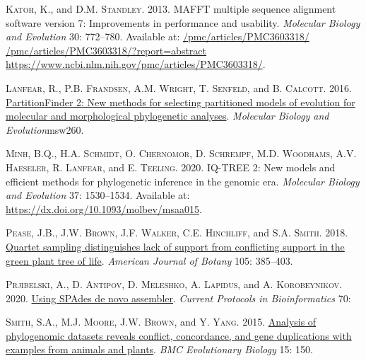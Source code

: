\documentclass[
  12pt,
]{article}
\newlength{\cslhangindent}
\newlength{\cslentryspacingunit} %
\newenvironment{CSLReferences}[2] %
 {%
  \setlength{\parindent}{0pt}
  \ifodd #1
  \let\oldpar\par
  \def\par{\hangindent=\cslhangindent\oldpar}
  \fi
  \setlength{\parskip}{#2\cslentryspacingunit}
 }%
 {}
\begin{document}
\begin{CSLReferences}{1}{0}
\leavevmode{}%
\textsc{Katoh, K.}, and \textsc{D.M. Standley}. 2013. MAFFT multiple sequence alignment software version 7: Improvements in performance and usability. \emph{Molecular Biology and Evolution} 30: 772--780. Available at: \href{/pmc/articles/PMC3603318/\%20/pmc/articles/PMC3603318/?report=abstract\%20https://www.ncbi.nlm.nih.gov/pmc/articles/PMC3603318/}{/pmc/articles/PMC3603318/ /pmc/articles/PMC3603318/?report=abstract https://www.ncbi.nlm.nih.gov/pmc/articles/PMC3603318/}.

\leavevmode{}%
\textsc{Lanfear, R.}, \textsc{P.B. Frandsen}, \textsc{A.M. Wright}, \textsc{T. Senfeld}, and \textsc{B. Calcott}. 2016. \href{https://doi.org/10.1093/molbev/msw260}{PartitionFinder 2: New methods for selecting partitioned models of evolution for molecular and morphological phylogenetic analyses}. \emph{Molecular Biology and Evolution}msw260.

\leavevmode{}%
\textsc{Minh, B.Q.}, \textsc{H.A. Schmidt}, \textsc{O. Chernomor}, \textsc{D. Schrempf}, \textsc{M.D. Woodhams}, \textsc{A.V. Haeseler}, \textsc{R. Lanfear}, and \textsc{E. Teeling}. 2020. IQ-TREE 2: New models and efficient methods for phylogenetic inference in the genomic era. \emph{Molecular Biology and Evolution} 37: 1530--1534. Available at: \url{https://dx.doi.org/10.1093/molbev/msaa015}.

\leavevmode{}%
\textsc{Pease, J.B.}, \textsc{J.W. Brown}, \textsc{J.F. Walker}, \textsc{C.E. Hinchliff}, and \textsc{S.A. Smith}. 2018. \href{https://doi.org/10.1002/ajb2.1016}{Quartet sampling distinguishes lack of support from conflicting support in the green plant tree of life}. \emph{American Journal of Botany} 105: 385--403.

\leavevmode{}%
\textsc{Prjibelski, A.}, \textsc{D. Antipov}, \textsc{D. Meleshko}, \textsc{A. Lapidus}, and \textsc{A. Korobeynikov}. 2020. \href{https://doi.org/10.1002/cpbi.102}{Using SPAdes de novo assembler}. \emph{Current Protocols in Bioinformatics} 70:

\leavevmode{}%
\textsc{Smith, S.A.}, \textsc{M.J. Moore}, \textsc{J.W. Brown}, and \textsc{Y. Yang}. 2015. \href{https://doi.org/10.1186/s12862-015-0423-0}{Analysis of phylogenomic datasets reveals conflict, concordance, and gene duplications with examples from animals and plants}. \emph{BMC Evolutionary Biology} 15: 150.


\end{CSLReferences}
\end{document}

